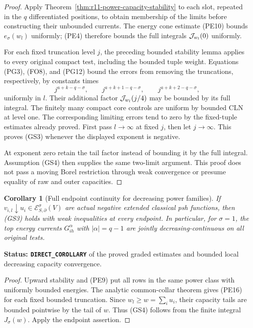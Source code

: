\documentclass[11pt,a4paper]{article}
\numberwithin{equation}{section}
\newtheorem{corollary}[theorem]{Corollary}
\theoremstyle{definition}
\theoremstyle{remark}
\begin{document}
\begin{proof}
Apply Theorem~\ref{thm:r11-power-capacity-stability} to
each slot, repeated in the $q$ differentiated positions,
to obtain membership of the limits before constructing
their unbounded currents. The energy cone estimate
(PE10) bounds $e_\sigma(w_l)$ uniformly; (PE4) therefore
bounds the full integrals $ {\cal J}_{w_l}(0)$ uniformly.

For each fixed truncation level $j$, the preceding
bounded stability lemma applies to every original
compact test, including the bounded tuple weight.
Equations (PG3), (FO8), and (PG12) bound the errors
from removing the truncations, respectively, by
constants times
\[
 j^{a+k-q-\sigma},\qquad
 j^{a+k+1-q-\sigma},\qquad
 j^{a+k+2-q-\sigma},
 \tag{GS5}
\]
uniformly in $l$. Their additional factor
$ {\cal J}_{w_l}(j/4)$ may be bounded by its full
integral. The finitely many compact core controls
are uniform by bounded CLN at level one.
The corresponding limiting errors tend to zero
by the fixed-tuple estimates already proved.
First pass $l\to\infty$ at fixed $j$, then let
$j\to\infty$. This proves (GS3) whenever the
displayed exponent is negative.

At exponent zero retain the tail factor instead
of bounding it by the full integral. Assumption
(GS4) then supplies the same two-limit argument.
This proof does not pass a moving Borel restriction
through weak convergence or presume equality of
raw and outer capacities.
\end{proof}

\begin{corollary}[Full endpoint continuity for decreasing power families]
\label{cor:r11-decreasing-graded-endpoints}
If $v_{i,l}\downarrow u_i\in
\mathcal E^\sigma_{S,\partial}(V)$ are actual negative
extended classical psh functions, then (GS3) holds
with weak inequalities at every endpoint.
In particular, for $\sigma=1$, the top energy
currents $G^\alpha_{ih}$ with $|\alpha|=q-1$
are jointly decreasing-continuous on all original tests.
\end{corollary}

\noindent\textbf{Status: \texttt{DIRECT\_COROLLARY}}
of the proved graded estimates and bounded local
decreasing capacity convergence.

\begin{proof}
Upward stability and (PE9) put all rows in the
same power class with uniformly bounded energies.
The analytic common-collar theorem gives (PE16)
for each fixed bounded truncation. Since
$w_l\geq w=\sum_i u_i$, their capacity tails
are bounded pointwise by the tail of $w$.
Thus (GS4) follows from the finite integral
$J_\sigma(w)$. Apply the endpoint assertion.
\end{proof}
\end{document}
